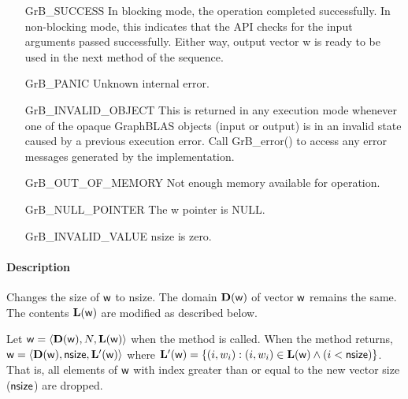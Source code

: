 \begin{itemize}[leftmargin=2.1in]
    \item[{\sf GrB\_SUCCESS}]         In blocking mode, the operation completed
    successfully. In non-blocking mode, this indicates that the API checks 
    for the input arguments passed successfully. Either way, output vector 
    {\sf w} is ready to be used in the next method of the sequence.

    \item[{\sf GrB\_PANIC}]           Unknown internal error.
    
    \item[{\sf GrB\_INVALID\_OBJECT}] This is returned in any execution mode 
    whenever one of the opaque GraphBLAS objects (input or output) is in an invalid 
    state caused by a previous execution error.  Call {\sf GrB\_error()} to access 
    any error messages generated by the implementation.

    \item[{\sf GrB\_OUT\_OF\_MEMORY}] Not enough memory available for operation.
    
    \item[{\sf GrB\_NULL\_POINTER}]  The {\sf w} pointer is {\sf NULL}.
    
    \item[{\sf GrB\_INVALID\_VALUE}] {\sf nsize} is zero.
\end{itemize}

\paragraph{Description}

Changes the size of ${\sf w}$ to {\sf nsize}. The domain
$\mathbf{D}({\sf w})$ of vector ${\sf w}$ remains the same. The
contents $\mathbf{L}({\sf w})$ are modified as described below.

Let ${\sf w} = \langle \mathbf{D}({\sf w}), N, \mathbf{L}({\sf w})
\rangle$ when the method is called. When the method returns, ${\sf w}
= \langle \mathbf{D}({\sf w}), {\sf nsize}, \mathbf{L'}({\sf w})
\rangle$ where $\mathbf{L'}({\sf w}) = \{(i,w_i) : (i,w_i) \in
\mathbf{L}({\sf w}) \wedge (i < {\sf nsize})\}$. That is, all elements
of ${\sf w}$ with index greater than or equal to the new vector size
(${\sf nsize}$) are dropped.


